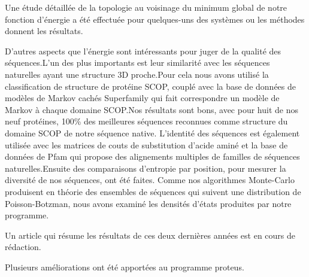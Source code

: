 \documentclass[a4paper,11pt]{article}
\begin{document}
\begin{spacing}{1.0}
Une étude détaillée de la topologie au voisinage du minimum global de notre fonction d'énergie a été effectuée pour quelques-uns des systèmes ou les méthodes donnent les résultats. 

D'autres aspects que l'énergie sont intéressants pour juger de la qualité des séquences.L'un des plus importants est leur similarité  avec les séquences naturelles ayant une  structure 3D proche.Pour cela nous avons utilisé la classification de structure de protéine SCOP, couplé avec la base de données de modèles de Markov cachés Superfamily qui fait correspondre un modèle de Markov à chaque domaine SCOP.Nos résultats sont bons, avec pour huit de nos neuf protéines, 100\% des meilleures séquences  reconnues comme structure du domaine SCOP de notre séquence native.
L'identité des séquences est également utilisée avec les matrices de couts de substitution d'acide aminé et la base de données de Pfam qui propose des alignements multiples de familles de séquences naturelles.Ensuite des comparaisons d'entropie par position, pour mesurer la diversité de nos séquences, ont été faites. 
Comme nos algorithmes Monte-Carlo produisent en théorie des ensembles de séquences qui suivent une distribution de Poisson-Botzman, nous avons examiné les densités d'états produites par notre programme.

Un article qui résume les résultats de ces deux dernières années est en cours de rédaction.

Plusieurs améliorations ont été apportées au programme proteus.


 

\end{spacing}
\end{document}
